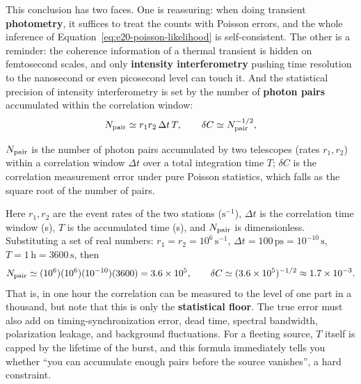 This conclusion has two faces. One is reassuring: when doing transient \textbf{photometry}, it suffices to treat the counts with Poisson errors, and the whole inference of Equation~\eqref{eq:e20-poisson-likelihood} is self-consistent. The other is a reminder: the coherence information of a thermal transient is hidden on femtosecond scales, and only \textbf{intensity interferometry} pushing time resolution to the nanosecond or even picosecond level can touch it. And the statistical precision of intensity interferometry is set by the number of \textbf{photon pairs} accumulated within the correlation window:
\begin{equation}
  N_{\rm pair}\simeq r_1 r_2\,\Delta t\,T,
  \qquad
  \delta C\simeq N_{\rm pair}^{-1/2},
  \label{eq:e20-pair-statistics}
\end{equation}
\begin{formulaexplain}
\(N_{\rm pair}\) is the number of photon pairs accumulated by two telescopes (rates \(r_1,r_2\)) within a correlation window \(\Delta t\) over a total integration time \(T\); \(\delta C\) is the correlation measurement error under pure Poisson statistics, which falls as the square root of the number of pairs.
\end{formulaexplain}
Here \(r_1,r_2\) are the event rates of the two stations (\(\mathrm{s^{-1}}\)), \(\Delta t\) is the correlation time window (s), \(T\) is the accumulated time (s), and \(N_{\rm pair}\) is dimensionless. Substituting a set of real numbers: \(r_1=r_2=10^6\,\mathrm{s^{-1}}\), \(\Delta t=100\,\mathrm{ps}=10^{-10}\,\mathrm{s}\), \(T=1\,\mathrm{h}=3600\,\mathrm{s}\), then
\[
  N_{\rm pair}\simeq (10^6)(10^6)(10^{-10})(3600)=3.6\times10^{5},
  \qquad
  \delta C\simeq (3.6\times10^5)^{-1/2}\approx1.7\times10^{-3}.
\]
That is, in one hour the correlation can be measured to the level of one part in a thousand, but note that this is only the \textbf{statistical floor}. The true error must also add on timing-synchronization error, dead time, spectral bandwidth, polarization leakage, and background fluctuations. For a fleeting source, \(T\) itself is capped by the lifetime of the burst, and this formula immediately tells you whether ``you can accumulate enough pairs before the source vanishes'', a hard constraint.

